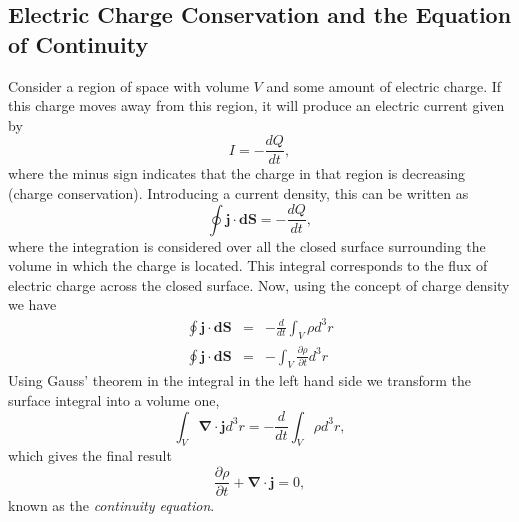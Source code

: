 \subsection{Electric Charge Conservation and the Equation of Continuity}
Consider a region of space with volume $V$ and some amount of electric charge. If this charge moves away from this region, it will produce an electric current given by
\begin{equation}
I = -\frac{dQ}{dt},
\end{equation}
where the minus sign indicates that the charge in that region is decreasing (charge conservation). Introducing a current density, this can be written as
\begin{equation}
 \oint \textbf{j} \cdot \textbf{dS} = -\frac{dQ}{dt},
\end{equation}
where the integration is considered over all the closed surface surrounding the volume in which the charge is located. This integral corresponds to the flux of electric charge across the closed surface. Now, using the concept of charge density we have 
\begin{eqnarray}
 \oint \textbf{j} \cdot \textbf{dS} &=& -\frac{d}{dt} \int_V \rho d^3r \\
 \oint \textbf{j} \cdot \textbf{dS} &=& - \int_V\frac{\partial \rho}{\partial t} d^3r
\end{eqnarray}
Using Gauss' theorem in the integral in the left hand side we transform the surface integral into a volume one,
\begin{equation}
 \int_V \boldsymbol{ \nabla} \cdot \textbf{j} d^3r = -\frac{d}{dt} \int_V \rho d^3r,
\end{equation}
which gives the final result
\begin{equation}
\frac{\partial \rho}{\partial t} + \boldsymbol{\nabla} \cdot \textbf{j} = 0, \label{eq:continuityEquation}
\end{equation}
known as the \textit{continuity equation}.\\

